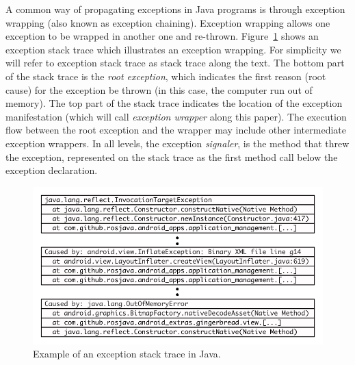 \documentclass[conference]{IEEEtran}
\begin{document}
 A common way of  propagating exceptions in Java programs is through exception wrapping
 (also known as exception chaining). Exception wrapping allows one exception 
to be wrapped in another one and re-thrown. Figure~\ref{fig:wrapping} shows 
an exception stack trace which illustrates an exception wrapping. 
For simplicity we will refer to exception stack trace as stack trace along the text.
The bottom part of the stack trace is the \emph{root exception}, which indicates
the first reason (root cause) for the exception be thrown (in this case, the computer run out of
memory). The top part of the stack trace indicates the location of the exception
manifestation (which will call \emph{exception wrapper} along this paper). The
execution flow  between the root exception and the wrapper may
include other intermediate exception wrappers. In all levels, the exception
\emph{signaler}, is the method that threw the exception, represented on the
stack trace as the first method call below the exception declaration.

\begin{figure} \centering \includegraphics[scale=0.6]{stacktrace_bw.png}
\caption{Example of an exception stack trace in Java.}
\label{fig:wrapping}
\end{figure}


\end{document}
